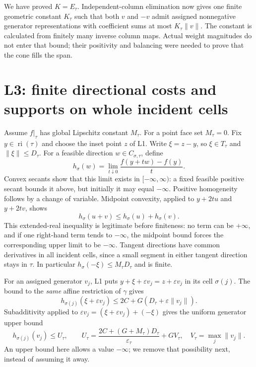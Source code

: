 \documentclass[
  11pt,
]{article}
\begin{document}
We have proved \(K=E_\tau\). Independent-column elimination now gives
one finite geometric constant \(K_\tau\) such that both \(v\) and \(-v\)
admit assigned nonnegative generator representations with coefficient
sums at most \(K_\tau\|v\|\). The constant is calculated from finitely
many inverse column maps. Actual weight magnitudes do not enter that
bound; their positivity and balancing were needed to prove that the cone
fills the span.

\section{L3: finite directional costs and supports on whole incident
cells}\label{l3-finite-directional-costs-and-supports-on-whole-incident-cells}

Assume \(f|_\tau\) has global Lipschitz constant \(M_\tau\). For a point
face set \(M_\tau=0\). Fix \(y\in\operatorname{ri}(\tau)\) and choose
the inset point \(z\) of L1. Write \(\xi=z-y\), so \(\xi\in T_\tau\) and
\(\|\xi\|\leq D_\tau\). For a feasible direction
\(w\in C_{\sigma,\tau}\), define
\[ h_\sigma(w)=\lim_{t\downarrow0}\frac{f(y+t w)-f(y)}t. \] Convex
secants show that this limit exists in \([-\infty,\infty)\): a fixed
feasible positive secant bounds it above, but initially it may equal
\(-\infty\). Positive homogeneity follows by a change of variable.
Midpoint convexity, applied to \(y+2t u\) and \(y+2t v\), shows
\[ h_\sigma(u+v)\leq h_\sigma(u)+h_\sigma(v). \] This extended-real
inequality is legitimate before finiteness: no term can be \(+\infty\),
and if one right-hand term tends to \(-\infty\), the midpoint bound
forces the corresponding upper limit to be \(-\infty\). Tangent
directions have common derivatives in all incident cells, since a small
segment in either tangent direction stays in \(\tau\). In particular
\(h_\sigma(-\xi)\leq M_\tau D_\tau\) and is finite.

For an assigned generator \(v_j\), L1 puts
\(y+\xi+\varepsilon v_j=z+\varepsilon v_j\) in its cell \(\sigma(j)\).
The bound to the \emph{same} affine restriction of \(\gamma\) gives
\[ h_{\sigma(j)}(\xi+\varepsilon v_j)
\leq 2C+G(D_\tau+\varepsilon\|v_j\|). \] Subadditivity applied to
\(\varepsilon v_j=(\xi+\varepsilon v_j)+(-\xi)\) gives the uniform
generator upper bound \[
h_{\sigma(j)}(v_j)\leq U_\tau,
\qquad U_\tau=\frac{2C+(G+M_\tau)D_\tau}{\varepsilon_\tau}+G V_\tau,
\quad V_\tau=\max_j\|v_j\|.
\] An upper bound here allows a value \(-\infty\); we remove that
possibility next, instead of assuming it away.
\end{document}

